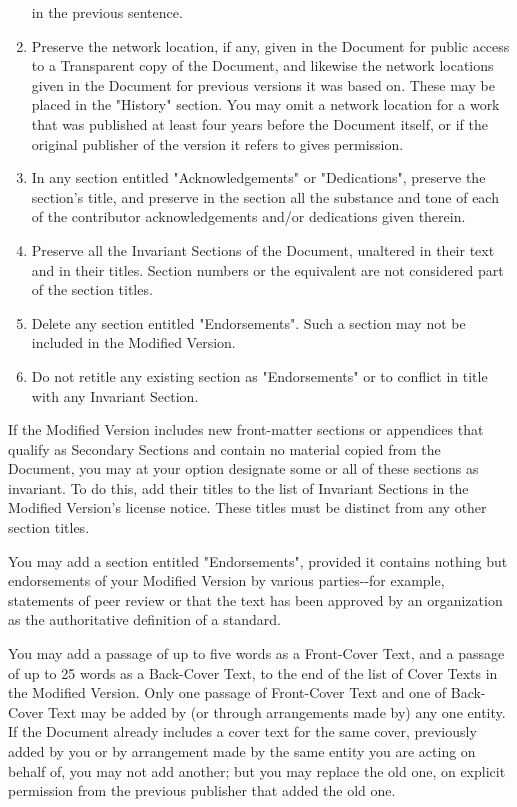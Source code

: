 \begin{enumerate}
  in the previous sentence.
\item
  Preserve the network location, if any, given in the Document for
  public access to a Transparent copy of the Document, and likewise the
  network locations given in the Document for previous versions it was
  based on. These may be placed in the "History" section. You may omit a
  network location for a work that was published at least four years
  before the Document itself, or if the original publisher of the
  version it refers to gives permission.
\item
  In any section entitled "Acknowledgements" or "Dedications", preserve
  the section's title, and preserve in the section all the substance and
  tone of each of the contributor acknowledgements and/or dedications
  given therein.
\item
  Preserve all the Invariant Sections of the Document, unaltered in
  their text and in their titles. Section numbers or the equivalent are
  not considered part of the section titles.
\item
  Delete any section entitled "Endorsements". Such a section may not be
  included in the Modified Version.
\item
  Do not retitle any existing section as "Endorsements" or to conflict
  in title with any Invariant Section.
\end{enumerate}

If the Modified Version includes new front-matter sections or appendices
that qualify as Secondary Sections and contain no material copied from
the Document, you may at your option designate some or all of these
sections as invariant. To do this, add their titles to the list of
Invariant Sections in the Modified Version's license notice. These
titles must be distinct from any other section titles.

You may add a section entitled "Endorsements", provided it contains
nothing but endorsements of your Modified Version by various
parties-\/-for example, statements of peer review or that the text has
been approved by an organization as the authoritative definition of a
standard.

You may add a passage of up to five words as a Front-Cover Text, and a
passage of up to 25 words as a Back-Cover Text, to the end of the list
of Cover Texts in the Modified Version. Only one passage of Front-Cover
Text and one of Back-Cover Text may be added by (or through arrangements
made by) any one entity. If the Document already includes a cover text
for the same cover, previously added by you or by arrangement made by
the same entity you are acting on behalf of, you may not add another;
but you may replace the old one, on explicit permission from the
previous publisher that added the old one.


